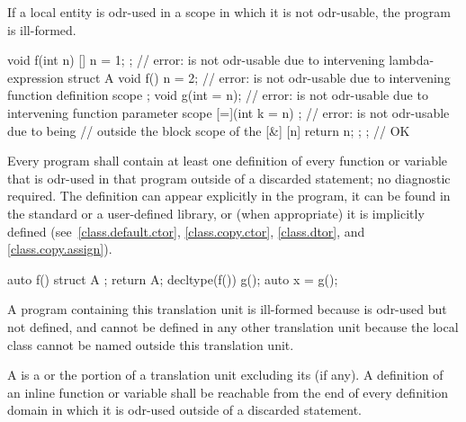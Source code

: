 If a local entity is odr-used
in a scope in which it is not odr-usable,
the program is ill-formed.
\begin{example}
\begin{codeblock}
void f(int n) {
  [] { n = 1; };                // error:  is not odr-usable due to intervening lambda-expression
  struct A {
    void f() { n = 2; }         // error:  is not odr-usable due to intervening function definition scope
  };
  void g(int = n);              // error:  is not odr-usable due to intervening function parameter scope
  [=](int k = n) {};            // error:  is not odr-usable due to being
                                // outside the block scope of the 
  [&] { [n]{ return n; }; };    // OK
}
\end{codeblock}
\end{example}

\pnum
Every program shall contain at least one definition of every
function or variable that is odr-used in that program
outside of a discarded statement; no diagnostic required.
The definition can appear explicitly in the program, it can be found in
the standard or a user-defined library, or (when appropriate) it is
implicitly defined (see~\ref{class.default.ctor}, \ref{class.copy.ctor},
\ref{class.dtor}, and \ref{class.copy.assign}).
\begin{example}
\begin{codeblock}
auto f() {
  struct A {};
  return A{};
}
decltype(f()) g();
auto x = g();
\end{codeblock}
A program containing this translation unit is ill-formed
because  is odr-used but not defined,
and cannot be defined in any other translation unit
because the local class  cannot be named outside this
translation unit.
\end{example}

\pnum
A  is
a  or
the portion of a translation unit
excluding its  (if any).
A definition of an inline function or variable shall be reachable
from the end of every definition domain
in which it is odr-used outside of a discarded statement.

